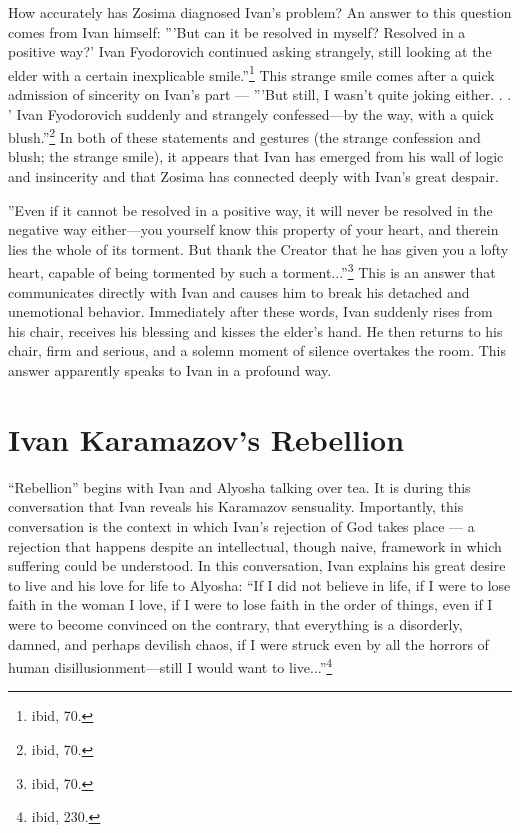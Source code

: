 How accurately has Zosima diagnosed Ivan's problem? An answer to this question comes from Ivan himself: '''But can it be resolved in myself? Resolved in a positive way?' Ivan Fyodorovich continued asking strangely, still looking at the elder with a certain inexplicable smile.''\footnote{ibid, 70.} This strange smile comes after a quick admission of sincerity on Ivan's part --- '''But still, I wasn't quite joking either. . . ' Ivan Fyodorovich suddenly and strangely confessed---by the way, with a quick blush.''\footnote{ibid, 70.} In both of these statements and gestures (the strange confession and blush; the strange smile), it appears that Ivan has emerged from his wall of logic and insincerity and that Zosima has connected deeply with Ivan's great despair.

''Even if it cannot be resolved in a positive way, it will never be resolved in the negative way either---you yourself know this property of your heart, and therein lies the whole of its torment. But thank the Creator that he has given you a lofty heart, capable of being tormented by such a torment...''\footnote{ibid, 70.} This is an answer that communicates directly with Ivan and causes him to break his detached and unemotional behavior. Immediately after these words, Ivan suddenly rises from his chair, receives his blessing and kisses the elder's hand. He then returns to his chair, firm and serious, and a solemn moment of silence overtakes the room. This answer apparently speaks to Ivan in a profound way.

\section{Ivan Karamazov's Rebellion}
``Rebellion'' begins with Ivan and Alyosha talking over tea. It is during this conversation that Ivan reveals his Karamazov sensuality. Importantly, this conversation is the context in which Ivan's rejection of God takes place --- a rejection that happens despite an intellectual, though naive, framework in which suffering could be understood. In this conversation, Ivan explains his great desire to live and his love for life to Alyosha: ``If I did not believe in life, if I were to lose faith in the woman I love, if I were to lose faith in the order of things, even if I were to become convinced on the contrary, that everything is a disorderly, damned, and perhaps devilish chaos, if I were struck even by all the horrors of human disillusionment---still I would want to live...''\footnote{ibid, 230.}

